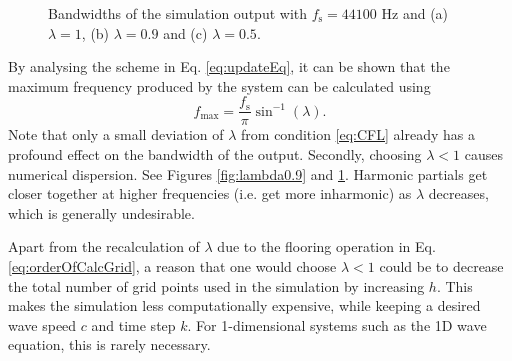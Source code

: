 \begin{figure}[h]
    \centering
    \caption{Bandwidths of the simulation output %
    with $f_\text{s} = 44100$ Hz and 
    (a) $\lambda = 1$, (b) $\lambda = 0.9$ and (c) $\lambda = 0.5$. 
    \label{fig:bandWidths}}
\end{figure}
%
By analysing the scheme in Eq. \eqref{eq:updateEq}, it can be shown that the maximum frequency produced by the system can be calculated using \cite[Chap. 6]{bilbao2009}
\begin{equation}\label{eq:fmax}
    f_\text{max} = \frac{f_\text{s}}{\pi} \sin^{-1}(\lambda).
\end{equation}
%
Note that only a small deviation of $\lambda$ from condition \eqref{eq:CFL} already has a profound effect on the bandwidth of the output.
%
Secondly, choosing $\lambda < 1$ causes numerical dispersion. See Figures \ref{fig:lambda0.9} and \ref{fig:bandWidths}. Harmonic partials get closer together at higher frequencies (i.e. get more inharmonic) as $\lambda$ decreases, which is generally undesirable.

Apart from the recalculation of $\lambda$ due to the flooring operation in Eq. \eqref{eq:orderOfCalcGrid}, a reason that one would choose $\lambda < 1$ could be to decrease the total number of grid points used in the simulation by increasing $h$. This makes the simulation less computationally expensive, while keeping a desired wave speed $c$ and time step $k$. For 1-dimensional systems such as the 1D wave equation, this is rarely necessary.
